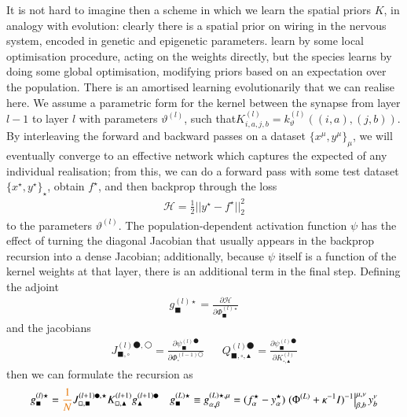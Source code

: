 \documentclass[../main.tex]{subfiles}
\begin{document}
It is not hard to imagine then a scheme in which we learn the spatial priors $K$, in analogy with evolution: clearly there is a spatial prior on wiring in the nervous system, encoded in genetic and epigenetic parameters.  learn by some local optimisation procedure, acting on the weights directly, but the species learns by doing some global optimisation, modifying priors based on an expectation over the population. There is an amortised learning  evolutionarily that we can realise here. We assume a parametric form for the kernel between the synapse from layer $l-1$ to layer $l$ with parameters $\vartheta^{(l)}$, such that\typo{ }$K^{(l)}_{i,a,j,b} = k^{(l)}_{\vartheta}((i, a), (j, b))$. By interleaving the forward and backward passes on a dataset $\{x^{\mu}, y^{\mu} \}_{\mu}$, we will eventually converge to an effective network which captures the expected  of any individual realisation; from this, we can do a forward pass with some test dataset $\{ x^{\star}, y^{\star} \}_{\star}$, obtain $f^{\star}$, and then backprop through the loss 
\begin{align*}
  \mathcal H = \frac12 ||y^{\star} - f^{\star}||^2_2
\end{align*}
to the parameters $\vartheta^{(l)}$. The population-dependent activation function $\psi$ has the effect of turning the diagonal Jacobian that usually appears in the backprop recursion into a dense Jacobian; additionally, because $\psi$ itself is a function of the kernel weights at that layer, there is an additional term in the final step. Defining the adjoint
\begin{align*}
  g^{(l)\star}_{\blacksquare} = \frac{\partial \mathcal H}{\partial \Phi^{(l)\star}_{\blacksquare} }
\end{align*}
and the jacobians
\begin{align*}
  J^{(l)\medbullet,\medcirc}_{\blacksquare, \square} = \frac{\partial \psi^{(l)\medbullet}_{\blacksquare}}{\partial \Phi^{(l-1)\medcirc}_{\square}}
&&
  Q^{(l)\medbullet}_{\blacksquare, \square, \blacktriangle} = \frac{\partial \psi^{(l)\medbullet}_{\blacksquare}}{\partial K^{(l)}_{\square, \blacktriangle}}
\end{align*}
then we can formulate the recursion as
\begin{align*}
  g^{(l)\star}_{\blacksquare}
  =
  \fix{\frac1N}
  J^{(l+1)\medbullet,\star}_{\square, \blacksquare}
  K^{(l+1)}_{\square, \blacktriangle} 
  g^{(l+1)\medbullet}_{\blacktriangle}
  &&
  g^{(L)\star}_{\blacksquare} 
  \equiv
  g^{(L)\star,\mu}_{\alpha, \beta} 
  =
  (f^{\star}_{\alpha} - y^{\star}_{\alpha}) 
    \left. (\Phi^{(L)} + \kappa^{-1} I)^{-1} \right|^{\mu,\nu}_{\beta, b} 
    y^{\nu}_b
\end{align*}
\end{document}
